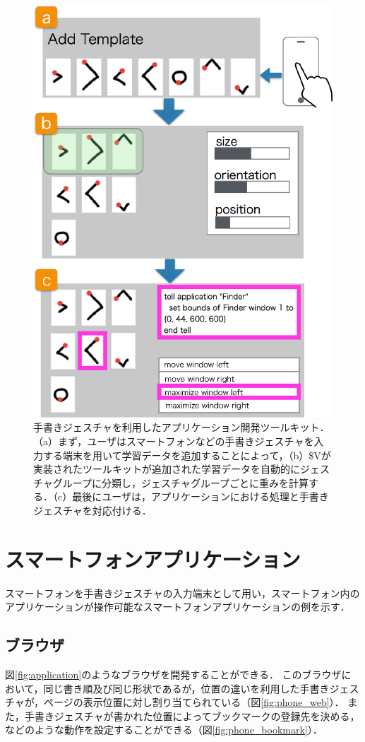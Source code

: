 \begin{figure} [h!]
	\begin{center}
		\includegraphics [width=0.7\hsize ]{img/flow.eps}
	\end{center}
	\caption{手書きジェスチャを利用したアプリケーション開発ツールキット．（a）まず，ユーザはスマートフォンなどの手書きジェスチャを入力する端末を用いて学習データを追加することによって，（b）\$Vが実装されたツールキットが追加された学習データを自動的にジェスチャグループに分類し，ジェスチャグループごとに重みを計算する．（c）最後にユーザは，アプリケーションにおける処理と手書きジェスチャを対応付ける．}
	\label{fig:flow}
\end{figure}


\clearpage
\section{スマートフォンアプリケーション}
スマートフォンを手書きジェスチャの入力端末として用い，スマートフォン内のアプリケーションが操作可能なスマートフォンアプリケーションの例を示す．
\subsection{ブラウザ}
図\ref{fig:application}のようなブラウザを開発することができる．
このブラウザにおいて，同じ書き順及び同じ形状であるが，位置の違いを利用した手書きジェスチャが，ページの表示位置に対し割り当てられている（図\ref{fig:phone_web}）．
また，手書きジェスチャが書かれた位置によってブックマークの登録先を決める，などのような動作を設定することができる（図\ref{fig:phone_bookmark}）．

